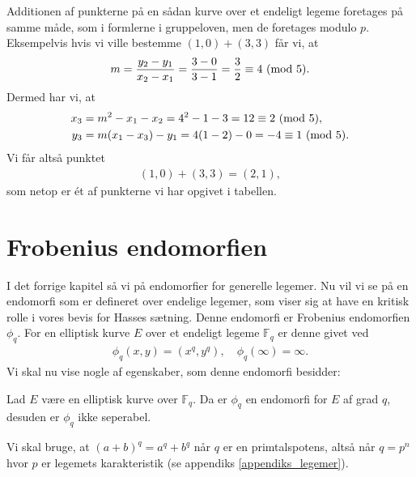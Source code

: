 Additionen af punkterne på en sådan kurve over et endeligt legeme foretages på samme måde, som i formlerne i gruppeloven, men de foretages modulo $p$. Eksempelvis hvis vi ville bestemme $(1,0) + (3,3)$ får vi, at 
\begin{align*} 
	m = \frac{y_2 - y_1}{x_2 - x_1} = \frac{3 - 0}{3 - 1} = \frac{3}{2} \equiv 4 \ (\mathrm{mod} \ 5).
\end{align*}
Dermed har vi, at 
\begin{align*}
	x_3 &= m^2 - x_1 - x_2 = 4^2 - 1 - 3 = 12 \equiv 2 \ (\mathrm{mod} \ 5), \\
	y_3 &= m(x_1 - x_3) - y_1 = 4(1-2)-0 = -4 \equiv 1 \ (\mathrm{mod} \ 5).
\end{align*}
Vi får altså punktet
\begin{align*}
	(1, 0) + (3, 3) = (2, 1),
\end{align*}
som netop er ét af punkterne vi har opgivet i tabellen.

\section{Frobenius endomorfien}
I det forrige kapitel så vi på endomorfier for generelle legemer. Nu vil vi se på en endomorfi som er defineret over endelige legemer, som viser sig at have en kritisk rolle i vores bevis for Hasses sætning. Denne endomorfi er Frobenius endomorfien $\phi_q$. For en elliptisk kurve $E$ over et endeligt legeme $\mathbb{F}_q$ er denne givet ved
\begin{align}
	\phi_q (x, y) = (x^q, y^q), \quad \phi_q(\infty) = \infty.
\end{align}
Vi skal nu vise nogle af egenskaber, som denne endomorfi besidder:

\begin{lemma}
\label{lemma_end_degree_not_sep}
Lad $E$ være en elliptisk kurve over $\mathbb{F}_q$. Da er $\phi_q$ en 
endomorfi for $E$ af grad $q$, desuden er $\phi_q$ ikke seperabel.
\end{lemma}
Vi skal bruge, at $(a + b)^q = a^q + b^q$ når $q$ er en primtalspotens, altså når $q=p^n$ hvor $p$ er legemets karakteristik (se appendiks \ref{appendiks_legemer}).

